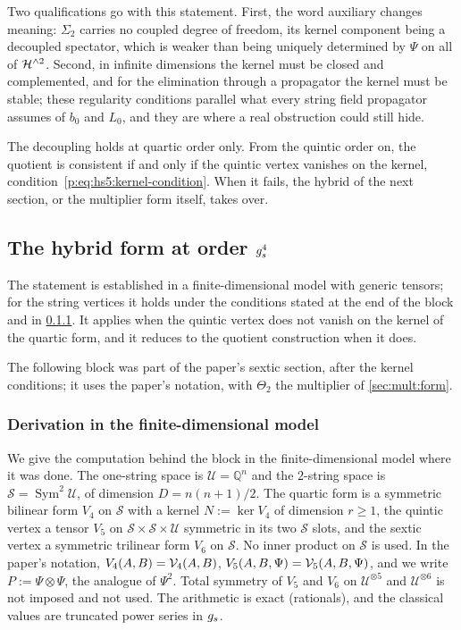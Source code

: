 Two qualifications go with this statement.
First, the word auxiliary changes meaning: $\Sigma_2$ carries no coupled degree of freedom, its kernel component being a decoupled spectator, which is weaker than being uniquely determined by $\Psi$ on all of $\mathcal{H}^{\wedge 2}$.
Second, in infinite dimensions the kernel must be closed and complemented, and for the elimination through a propagator the kernel must be stable; these regularity conditions parallel what every string field propagator assumes of $b_0$ and $L_0$, and they are where a real obstruction could still hide.

The decoupling holds at quartic order only.
From the quintic order on, the quotient is consistent if and only if the quintic vertex vanishes on the kernel, condition~\eqref{p:eq:hs5:kernel-condition}.
When it fails, the hybrid of the next section, or the multiplier form itself, takes over.

\subsection{The hybrid form at order \texorpdfstring{$g_s^4$}{gs4}}
\label{sec:mult:hybrid}

The statement is established in a finite-dimensional model with generic tensors; for the string vertices it holds under the conditions stated at the end of the block and in \cref{sec:mult:hybrid-derivation}.
It applies when the quintic vertex does not vanish on the kernel of the quartic form, and it reduces to the quotient construction when it does.

The following block was part of the paper's sextic section, after the kernel conditions; it uses the paper's notation, with $\Theta_2$ the multiplier of \cref{sec:mult:form}.



\subsubsection{Derivation in the finite-dimensional model}
\label{sec:mult:hybrid-derivation}

We give the computation behind the block in the finite-dimensional model where it was done.
The one-string space is $\mathcal U = \mathbb{Q}^n$ and the $2$-string space is $\mathcal S = \operatorname{Sym}^2 \mathcal U$, of dimension $D = n (n + 1) / 2$.
The quartic form is a symmetric bilinear form $V_4$ on $\mathcal S$ with a kernel $N := \ker V_4$ of dimension $r \ge 1$, the quintic vertex a tensor $V_5$ on $\mathcal S \times \mathcal S \times \mathcal U$ symmetric in its two $\mathcal S$ slots, and the sextic vertex a symmetric trilinear form $V_6$ on $\mathcal S$.
No inner product on $\mathcal S$ is used.
In the paper's notation, $V_4(A, B) = \mathcal{V}_{4}(A, B)$, $V_5(A, B, \Psi) = \mathcal{V}_{5}(A, B, \Psi)$, and we write $P := \Psi \otimes \Psi$, the analogue of $\Psi^2$.
Total symmetry of $V_5$ and $V_6$ on $\mathcal U^{\otimes 5}$ and $\mathcal U^{\otimes 6}$ is not imposed and not used.
The arithmetic is exact (rationals), and the classical values are truncated power series in $g_s$.

